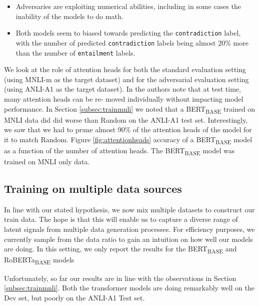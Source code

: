 \begin{itemize}
	\item Adversaries are exploiting numerical abilities, including in some cases the inability of the models to do math.  
	\item Both models seem to biased towards predicting the \texttt{contradiction} label, with the number of predicted \texttt{contradiction} labels being almost 20\% more than the number of \texttt{entailment} labels.
	
\end{itemize}

 We look at the role of attention heads for both the standard evaluation setting (using MNLI-m as the target dataset) and for the adversarial evaluation setting (using ANLI-A1 as the target dataset). In \cite{michel2019sixteen} the authors note that at test time, many attention heads can be re-
moved individually without impacting model performance. In Section \ref{subsec:trainmnli} we noted that a BERT\textsubscript{BASE} trained on MNLI data did did worse than Random on the ANLI-A1 test set. Interestingly, we saw that we had to prune almost 90\% of the attention heads of the model for it to match Random. Figure \ref{fig:attentionheads} accuracy of a BERT\textsubscript{BASE} model as a function of the number of attention heads. The BERT\textsubscript{BASE} model was trained on MNLI only data.

\subsection{Training on multiple data sources}
\label{subsec:trainmultiple}

In line with our stated hypothesis, we now mix multiple datasets to construct our train data. The hope is that this will enable us to capture a diverse range of latent signals from multiple data generation processes. For efficiency purposes, we currently sample from the data ratio to gain an intuition on how well our models are doing. In this setting, we only report the results for the BERT\textsubscript{BASE} and RoBERTa\textsubscript{BASE} models

Unfortunately, so far our results are in line with the observations in Section \ref{subsec:trainmnli}. Both the transformer models are doing remarkably well on the Dev set, but poorly on the ANLI-A1 Test set.
